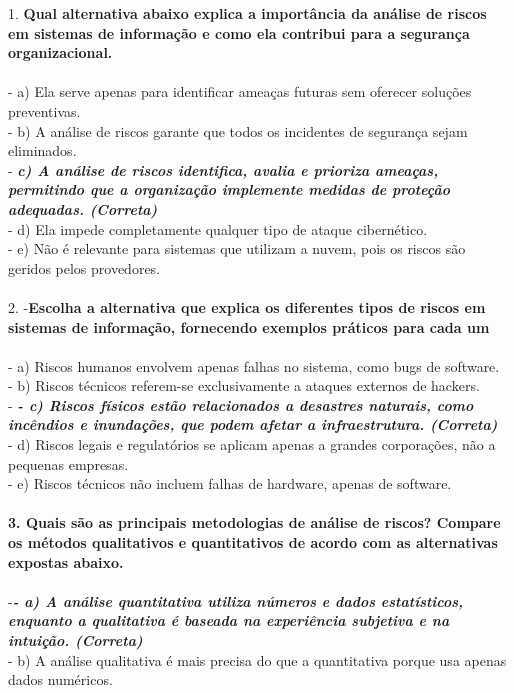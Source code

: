 \documentclass[12pt,oneside,a4paper,article]{abntex2}
\begin{document}
 1. \textbf{Qual alternativa abaixo explica a importância da análise de riscos em sistemas de informação e como ela contribui para a segurança organizacional.}\\\\
   - a) Ela serve apenas para identificar ameaças futuras sem oferecer soluções preventivas.\\
   - b) A análise de riscos garante que todos os incidentes de segurança sejam eliminados.\\
   -\textit{\textbf{ c) A análise de riscos identifica, avalia e prioriza ameaças, permitindo que a organização implemente medidas de proteção adequadas. (Correta)}}\\
   - d) Ela impede completamente qualquer tipo de ataque cibernético.\\
   - e) Não é relevante para sistemas que utilizam a nuvem, pois os riscos são geridos pelos provedores.\\
\\
2. -\textbf{Escolha a alternativa que explica os diferentes tipos de riscos em sistemas de informação, fornecendo exemplos práticos para cada um}\\\\
   - a) Riscos humanos envolvem apenas falhas no sistema, como bugs de software.\\
   - b) Riscos técnicos referem-se exclusivamente a ataques externos de hackers.\\
 -\textit{\textbf{  - c) Riscos físicos estão relacionados a desastres naturais, como incêndios e inundações, que podem afetar a infraestrutura. (Correta)}}\\
   - d) Riscos legais e regulatórios se aplicam apenas a grandes corporações, não a pequenas empresas.\\
   - e) Riscos técnicos não incluem falhas de hardware, apenas de software.\\
\\
\textbf{3. Quais são as principais metodologias de análise de riscos? Compare os métodos qualitativos e quantitativos de acordo com as alternativas expostas abaixo.}\\\\
   -\textit{\textbf{- a) A análise quantitativa utiliza números e dados estatísticos, enquanto a qualitativa é baseada na experiência subjetiva e na intuição. (Correta)}}\\
   - b) A análise qualitativa é mais precisa do que a quantitativa porque usa apenas dados numéricos.\\
\end{document}
